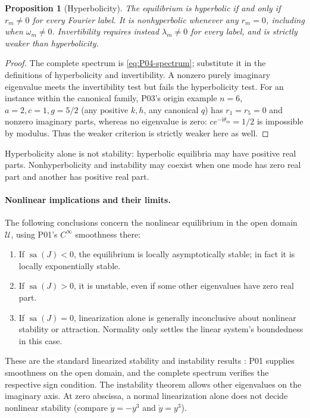\documentclass[11pt]{article}
\newcommand{\ii}{\mathrm{i}}
\newcommand{\Domain}{\mathcal{U}}
\DeclareMathOperator{\sa}{sa}
\newtheorem{proposition}[theorem]{Proposition}
\theoremstyle{definition}
\theoremstyle{remark}
\begin{document}
\begin{proposition}[Hyperbolicity]
\label{prop:P04-hyperbolicity}
The equilibrium is hyperbolic if and only if $r_m\ne0$ for every
Fourier label. It is nonhyperbolic whenever any $r_m=0$, including
when $\omega_m\ne0$. Invertibility requires instead
$\lambda_m\ne0$ for every label, and is strictly weaker than
hyperbolicity.
\end{proposition}
\begin{proof}
The complete spectrum is \eqref{eq:P04-spectrum}; substitute it in
the definitions of hyperbolicity and invertibility. A nonzero purely
imaginary eigenvalue meets the invertibility test but fails the
hyperbolicity test. For an instance within the canonical family,
P03's origin example $n=6$, $a=2,c=1,g=5/2$ (any positive $k,h$,
any canonical $q$) has $r_1=r_5=0$ and nonzero imaginary parts,
whereas no eigenvalue is zero: $ce^{-\ii\theta_m}=1/2$ is impossible
by modulus. Thus the weaker criterion is strictly weaker here as well.
\end{proof}
Hyperbolicity alone is not stability: hyperbolic equilibria may have
positive real parts. Nonhyperbolicity and instability may coexist
when one mode has zero real part and another has positive real part.

\paragraph{Nonlinear implications and their limits.}
The following conclusions concern the nonlinear equilibrium in the
open domain $\Domain$, using P01's $C^\infty$ smoothness there:
\begin{enumerate}[label=(\roman*),leftmargin=*]
\item If $\sa(J)<0$, the equilibrium is locally asymptotically stable;
in fact it is locally exponentially stable.
\item If $\sa(J)>0$, it is unstable, even if some other eigenvalues
have zero real part.
\item If $\sa(J)=0$, linearization alone is generally inconclusive
about nonlinear stability or attraction. Normality only settles the
linear system's boundedness in this case.
\end{enumerate}

These are the standard linearized stability and instability results
\cite[Ch.~1]{GuckenheimerHolmes1983}: P01 supplies smoothness on the
open domain, and the complete spectrum verifies the respective sign
condition. The instability theorem allows other eigenvalues on the
imaginary axis. At zero abscissa, a normal linearization alone does not
decide nonlinear stability (compare $\dot y=-y^3$ and $\dot y=y^3$).
\end{document}
